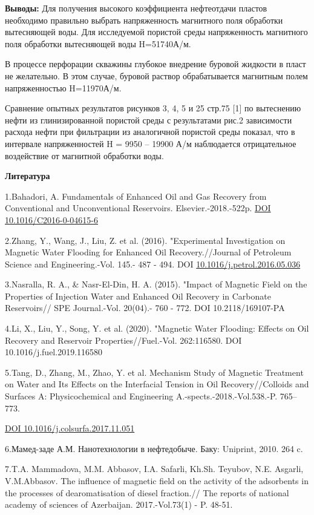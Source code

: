 {\bfseries Выводы:} Для получения высокого коэффициента нефтеотдачи пластов
необходимо правильно выбрать напряженность магнитного поля обработки
вытесняющей воды. Для исследуемой пористой среды напряженность
магнитного поля обработки вытесняющей воды H=51740А/м.

В процессе перфорации скважины глубокое внедрение буровой жидкости в
пласт не желательно. В этом случае, буровой раствор обрабатывается
магнитным полем напряженностью H=11970А/м.

Сравнение опытных результатов рисунков 3, 4, 5 и 25 стр.75 {[}1{]} по
вытеснению нефти из глинизированной пористой среды с результатами рис.2
зависимости расхода нефти при фильтрации из аналогичной пористой среды
показал, что в интервале напряженностей H = 9950 -- 19900 А/м
наблюдается отрицательное воздействие от магнитной обработки воды.

{\bfseries Литература}

1.Bahadori, A. Fundamentals of Enhanced Oil and Gas Recovery from
Conventional and Unconventional Reservoirs. Elsevier.-2018.-522p.
\href{https://doi.org/10.1016/C2016-0-04615-6}{DOI
10.1016/C2016-0-04615-6}

2.Zhang, Y., Wang, J., Liu, Z. et al. (2016). "Experimental
Investigation on Magnetic Water Flooding for Enhanced Oil
Recovery.//Journal of Petroleum Science and Engineering.-Vol. 145.- 487
- 494. DOI
\href{https://doi.org/10.1016/j.petrol.2016.05.036}{10.1016/j.petrol.2016.05.036}

3.Nasralla, R. A., \& Nasr-El-Din, H. A. (2015). "Impact of Magnetic
Field on the Properties of Injection Water and Enhanced Oil Recovery in
Carbonate Reservoirs// SPE Journal.-Vol. 20(04).- 760 - 772. DOI
10.2118/169107-PA

4.Li, X., Liu, Y., Song, Y. et al. (2020). "Magnetic Water Flooding:
Effects on Oil Recovery and Reservoir Properties//Fuel.-Vol. 262:116580.
DOI 10.1016/j.fuel.2019.116580

5.Tang, D., Zhang, M., Zhao, Y. et al. Mechanism Study of Magnetic
Treatment on Water and Its Effects on the Interfacial Tension in Oil
Recovery//Colloids and Surfaces A: Physicochemical and Engineering
A.-spects.-2018.-Vol.538.-P. 765--773.

\href{https://doi.org/10.1016/j.colsurfa.2017.11.051}{DOI
10.1016/j.colsurfa.2017.11.051}

6.Мамед-заде А.М. Нанотехнологии в нефтедобыче. Баку: Uniprint, 2010.
264 c.

7.T.A. Mammadova, M.M. Abbasov, I.A. Safarli, Kh.Sh. Teyubov, N.E.
Asgarli, V.M.Abbasov. The influence of magnetic field on the activity of
the adsorbents in the processes of dearomatisation of diesel fraction.//
The reports of national academy of sciences of Azerbaijan.
2017.-Vol.73(1) - P. 48-51.

